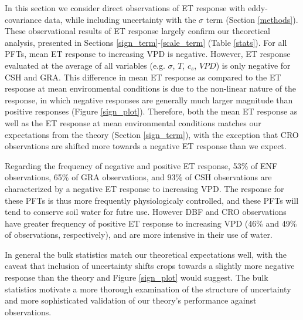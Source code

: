 \documentclass[draft,linenumbers]{gcbjournal}
\begin{document}
In this section we consider direct observations of ET response with eddy-covariance data, while including uncertainty with the $\sigma$ term (Section \ref{methods}). These observational results of ET response largely confirm our theoretical analysis, presented in Sections \ref{sign_term}-\ref{scale_term} (Table \ref{stats}). For all PFTs, mean ET response to increasing VPD is negative. However, ET response evaluated at the average of all variables (e.g. $\sigma$, $T$, $c_s$, $VPD$) is only negative for CSH and GRA. This difference in mean ET response as compared to the ET response at mean environmental conditions is due to the non-linear nature of the response, in which negative responses are generally much larger magnitude than positive responses (Figure \ref{sign_plot}). Therefore, both the mean ET response as well as the ET response at mean environmental conditions matches our expectations from the theory (Section \ref{sign_term}), with the exception that CRO observations are shifted more towards a negative ET response than we expect.

Regarding the frequency of negative and positive ET response, 53\% of ENF observations, 65\% of GRA observations, and 93\% of CSH observations are characterized by a negative ET response to increasing VPD. The response for these PFTs is thus more frequently physiologicaly controlled, and these PFTs will tend to conserve soil water for futre use. However DBF and CRO observations have greater frequency of positive ET response to increasing VPD (46\% and 49\% of observations, respectively), and are more intensive in their use of water. 

In general the bulk statistics match our theoretical expectations well, with the caveat that inclusion of uncertainty shifts crops towards a slightly more negative response than the theory and Figure \ref{sign_plot} would suggest. The bulk statistics motivate a more thorough examination of the structure of uncertainty and more sophisticated validation of our theory's performance against observations. 
\end{document}
